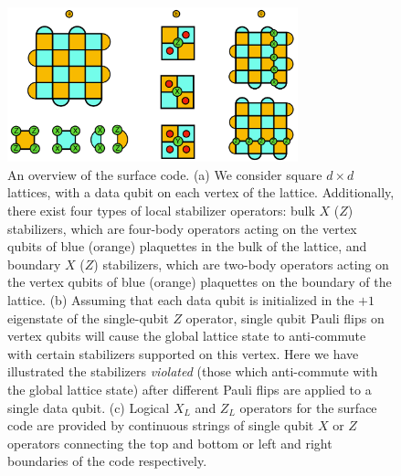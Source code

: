 \documentclass[onecolumn,preprintnumbers,amsmath,amssymb,notitlepage,nofootinbib,longbibliography,superscriptaddress,aps,pra,10pt]{revtex4-1}
\begin{document}
      \begin{figure}
      \centering
          \includegraphics[width=0.75\textwidth]{surface_code.pdf}
      \caption{An overview of the surface code. (a) We consider square $d\times d$ lattices, with a data qubit on each vertex of the lattice. Additionally, there exist four types of local stabilizer operators: bulk $X$ ($Z$) stabilizers, which are four-body operators acting on the vertex qubits of blue (orange) plaquettes in the bulk of the lattice, and boundary $X$ ($Z$) stabilizers, which are two-body operators acting on the vertex qubits of blue (orange) plaquettes on the boundary of the lattice. (b) Assuming that each data qubit is initialized in the $+1$ eigenstate of the single-qubit $Z$ operator, single qubit Pauli flips on vertex qubits will cause the global lattice state to anti-commute with certain stabilizers supported on this vertex. Here we have illustrated the stabilizers \textit{violated} (those which anti-commute with the global lattice state) after different Pauli flips are applied to a single data qubit. (c) Logical $X_L$ and $Z_L$ operators for the surface code are provided by continuous strings of single qubit $X$ or $Z$ operators connecting the top and bottom or left and right boundaries of the code respectively.}\label{f:surface_code}
    \end{figure}
\end{document}
